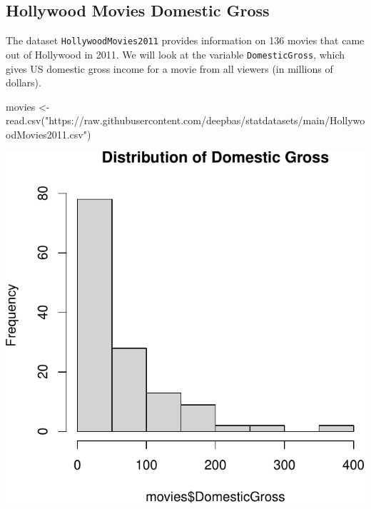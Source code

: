 \documentclass[
]{book}
\newenvironment{Shaded}{\begin{snugshade}}{\end{snugshade}}
\newcommand{\AttributeTok}[1]{\textcolor[rgb]{0.77,0.63,0.00}{#1}}
\newcommand{\FunctionTok}[1]{\textcolor[rgb]{0.00,0.00,0.00}{#1}}
\newcommand{\NormalTok}[1]{#1}
\newcommand{\OtherTok}[1]{\textcolor[rgb]{0.56,0.35,0.01}{#1}}
\newcommand{\SpecialCharTok}[1]{\textcolor[rgb]{0.00,0.00,0.00}{#1}}
\newcommand{\StringTok}[1]{\textcolor[rgb]{0.31,0.60,0.02}{#1}}
\begin{document}
\hypertarget{hollywood-movies-domestic-gross}{%
\subsection{Hollywood Movies Domestic Gross}\label{hollywood-movies-domestic-gross}}

The dataset \texttt{HollywoodMovies2011} provides information on 136 movies that came out of Hollywood in 2011. We will look at the variable \texttt{DomesticGross}, which gives US domestic gross income for a movie from all viewers (in millions of dollars).

\begin{Shaded}
\begin{Highlighting}[]
\NormalTok{movies }\OtherTok{\textless{}{-}} \FunctionTok{read.csv}\NormalTok{(}\StringTok{"https://raw.githubusercontent.com/deepbas/statdatasets/main/HollywoodMovies2011.csv"}\NormalTok{)}
\end{Highlighting}
\end{Shaded}

\begin{Shaded}
\end{Shaded}

\includegraphics[width=1\linewidth]{Class_Activity_5_files/figure-latex/unnamed-chunk-2-1}
\end{document}
